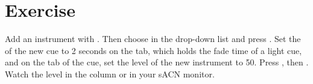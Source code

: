 \section*{Exercise}

Add an instrument with .  Then choose  in the
 drop-down list and press .  Set the  of
the new cue to 2 seconds on the  tab, which holds the fade time of
a light cue, and on the  tab of the cue, set the
level of the new instrument to 50.  Press , then
\@.  Watch the level in the  column or in your sACN monitor.
